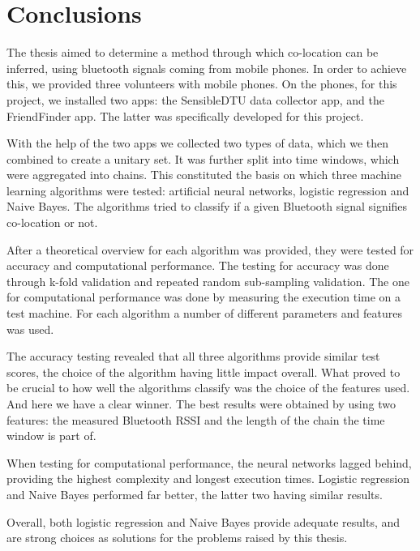 \chapter{Conclusions}

The thesis aimed to determine a method through which co-location can be inferred, using bluetooth signals coming from mobile phones. In order to achieve this, we provided three volunteers with mobile phones. On the phones, for this project, we installed two apps: the SensibleDTU data collector app, and the FriendFinder app. The latter was specifically developed for this project. 

With the help of the two apps we collected two types of data, which we then combined to create a unitary set. It was further split into time windows, which were aggregated into chains. This constituted the basis on which three machine learning algorithms were tested: artificial neural networks, logistic regression and Naive Bayes. The algorithms tried to classify if a given Bluetooth signal signifies co-location or not. 

After a theoretical overview for each algorithm was provided, they were tested for accuracy and computational performance. The testing for accuracy was done through k-fold validation and repeated random sub-sampling validation. The one for computational performance was done by measuring the execution time on a test machine. For each algorithm a number of different parameters and features was used. 

The accuracy testing revealed that all three algorithms provide similar test scores, the choice of the algorithm having little impact overall. What proved to be crucial to how well the algorithms classify was the choice of the features used. And here we have a clear winner. The best results were obtained by using two features: the measured Bluetooth RSSI and the length of the chain the time window is part of. 

When testing for computational performance, the neural networks lagged behind, providing the highest complexity and longest execution times. Logistic regression and Naive Bayes performed far better, the latter two having similar results. 

Overall, both logistic regression and Naive Bayes provide adequate results, and are strong choices as solutions for the problems raised by this thesis. 